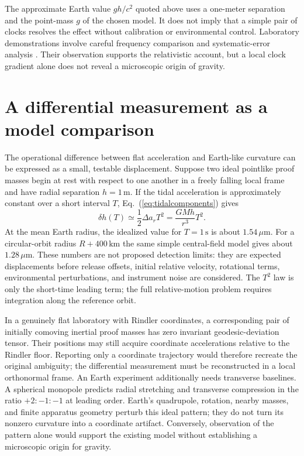 \documentclass[11pt,letterpaper]{article}
\begin{document}
The approximate Earth value $gh/c^2$ quoted above uses a one-meter separation and the point-mass $g$ of the chosen model. It does not imply that a simple pair of clocks resolves the effect without calibration or environmental control. Laboratory demonstrations involve careful frequency comparison and systematic-error analysis \cite{Bothwell,Zheng}. Their observation supports the relativistic account, but a local clock gradient alone does not reveal a microscopic origin of gravity.

\section{A differential measurement as a model comparison}

The operational difference between flat acceleration and Earth-like curvature can be expressed as a small, testable displacement. Suppose two ideal pointlike proof masses begin at rest with respect to one another in a freely falling local frame and have radial separation $h=1\,\mathrm m$. If the tidal acceleration is approximately constant over a short interval $T$, Eq.~(\ref{eq:tidalcomponents}) gives
\begin{equation}
 \delta h(T)\simeq\frac{1}{2}\Delta a_rT^2
 =\frac{GMh}{r^3}T^2.
\end{equation}
At the mean Earth radius, the idealized value for $T=1\,\mathrm s$ is about $1.54\,\mu\mathrm m$. For a circular-orbit radius $R+400\,\mathrm{km}$ the same simple central-field model gives about $1.28\,\mu\mathrm m$. These numbers are not proposed detection limits: they are expected displacements before release offsets, initial relative velocity, rotational terms, environmental perturbations, and instrument noise are considered. The $T^2$ law is only the short-time leading term; the full relative-motion problem requires integration along the reference orbit.

In a genuinely flat laboratory with Rindler coordinates, a corresponding pair of initially comoving inertial proof masses has zero invariant geodesic-deviation tensor. Their positions may still acquire coordinate accelerations relative to the Rindler floor. Reporting only a coordinate trajectory would therefore recreate the original ambiguity; the differential measurement must be reconstructed in a local orthonormal frame. An Earth experiment additionally needs transverse baselines. A spherical monopole predicts radial stretching and transverse compression in the ratio $+2:-1:-1$ at leading order. Earth's quadrupole, rotation, nearby masses, and finite apparatus geometry perturb this ideal pattern; they do not turn its nonzero curvature into a coordinate artifact. Conversely, observation of the pattern alone would support the existing model without establishing a microscopic origin for gravity.
\end{document}
